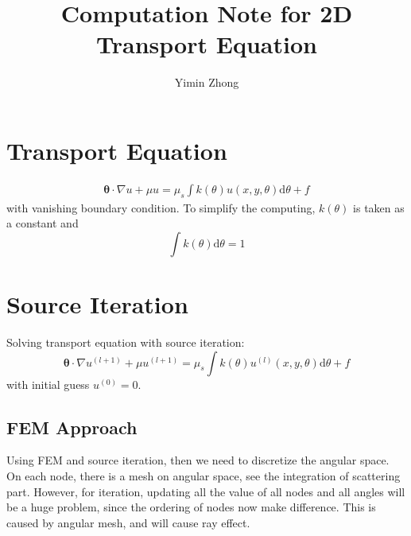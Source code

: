 \documentclass[12pt,a4paper]{article}
\author{Yimin Zhong}
\title{Computation Note for 2D Transport Equation}
\begin{document}
\maketitle
\section{Transport Equation}
\begin{eqnarray}
\mathbf{\theta}\cdot \nabla u + \mu u = \mu_s \int k(\theta) u(x,y,\theta)\mathrm{d}\theta + f
\end{eqnarray}
with vanishing boundary condition. To simplify the computing, $k(\theta)$ is taken as a constant and 
\begin{equation}
\int k(\theta)\mathrm{d}\theta = 1
\end{equation}
\section{Source Iteration}
Solving transport equation with source iteration:
\begin{equation}
\mathbf{\theta}\cdot \nabla u^{(l+1)} + \mu u^{(l+1)} = \mu_s \int k(\theta) u^{(l)}(x,y,\theta)\mathrm{d}\theta + f
\end{equation}
with initial guess $u^{(0)} = 0$. 

\subsection{FEM Approach}
Using FEM and source iteration, then we need to discretize the angular space. On each node, there is a mesh on angular space, see the integration of scattering part. However, for iteration, updating all the value of all nodes and all angles will be a huge problem, since the ordering of nodes now make difference. This is caused by angular mesh, and will cause ray effect.
\end{document}
